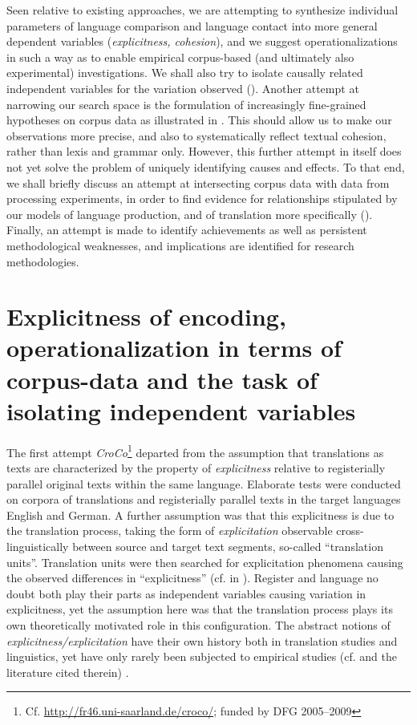 \documentclass[output=paper]{LSP/langsci}
\begin{document}
Seen relative to existing approaches, we are attempting to synthesize individual parameters of language comparison and language contact into more general dependent variables (\textit{explicitness, cohesion}), and we suggest operationalizations in such a way as to enable empirical corpus-based (and ultimately also experimental) investigations. We shall also try to isolate causally related independent variables for the variation observed (). Another attempt at narrowing our search space is the formulation of increasingly fine-grained hypotheses on corpus data as illustrated in . This should allow us to make our observations more precise, and also to systematically reflect textual cohesion, rather than lexis and grammar only. However, this further attempt in itself does not yet solve the problem of uniquely identifying causes and effects. To that end, we shall briefly discuss an attempt at intersecting corpus data with data from processing experiments, in order to find evidence for relationships stipulated by our models of language production, and of translation more specifically (). Finally, an attempt is made to identify achievements as well as persistent methodological weaknesses, and implications are identified for research methodologies.

\section{Explicitness of encoding, operationalization in terms of corpus-data and the task of isolating independent variables}\label{sec:steiner:2}

The first attempt \textit{CroCo}\footnote{Cf. \url{http://fr46.uni-saarland.de/croco/}; funded by DFG 2005--2009} departed from the assumption that translations as texts are characterized by the property of \textit{explicitness} relative to registerially parallel original texts within the same language. Elaborate tests were conducted on corpora of translations and registerially parallel texts in the target languages English and German. A further assumption was that this explicitness is due to the translation process, taking the form of \textit{explicitation} observable cross-linguistically between source and target text segments, so-called ``translation units''. Translation units were then searched for explicitation phenomena causing the observed differences in ``explicitness'' (cf.  in ). Register and language no doubt both play their parts as independent variables causing variation in explicitness, yet the assumption here was that the translation process plays its own theoretically motivated role in this configuration. The abstract notions of \textit{explicitness/explicitation} have their own history both in translation studies and linguistics, yet have only rarely been subjected to empirical studies (cf. \citealt{Englund-Dimitrova2005} and the literature cited therein) . 
\end{document}
